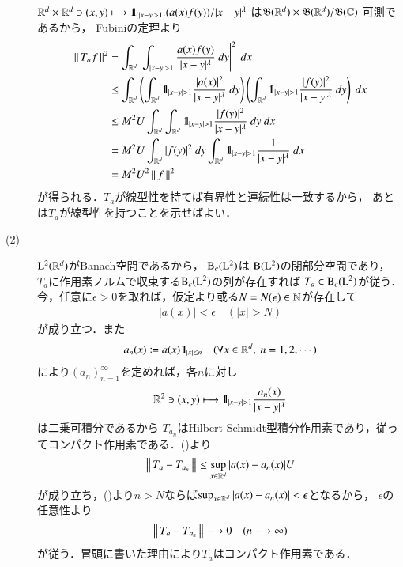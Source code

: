 \begin{prf}
\begin{description}
				$\R^d \times \R^d \ni (x,y) \longmapsto \defunc_{\left\{|x-y|>1\right\}} (a(x)f(y))/|x-y|^\lambda$
				は$\mathfrak{B}(\mathbb{R}^d) \times \mathfrak{B}(\mathbb{R}^d)/\mathfrak{B}(\mathbb{C})$-可測であるから，
				Fubiniの定理より
				\begin{align}
					\left\|\, T_a f\, \right\|_{}^2
					&= \int_{\mathbb{R}^d} \left| \int_{|x-y| > 1} \frac{a(x)f(y)}{|x-y|^\lambda}\ dy \right|^2\ dx \\
					&\leq \int_{\mathbb{R}^d} \left( \int_{\mathbb{R}^d} \mbox{1}\hspace{-0.25em}\mbox{l}_{|x-y| > 1} \frac{|a(x)|^2}{|x-y|^{\lambda}}\ dy \right)
						\left( \int_{\mathbb{R}^d} \mbox{1}\hspace{-0.25em}\mbox{l}_{|x-y| > 1} \frac{|f(y)|^2}{|x-y|^{\lambda}}\ dy \right)\ dx \\
					&\leq M^2 U \int_{\mathbb{R}^d} \int_{\mathbb{R}^d} \mbox{1}\hspace{-0.25em}\mbox{l}_{|x-y| > 1} \frac{|f(y)|^2}{|x-y|^{\lambda}}\ dy\ dx \\
					&= M^2 U \int_{\mathbb{R}^d} |f(y)|^2\ dy \int_{\mathbb{R}^d} \mbox{1}\hspace{-0.25em}\mbox{l}_{|x-y| > 1} \frac{1}{|x-y|^{\lambda}}\ dx \\
					&= M^2 U^2 \left\|\, f\, \right\|_{}^2
					\label{eq:report_6_1}
 				\end{align}
 				が得られる．$T_a$が線型性を持てば有界性と連続性は一致するから，
 				あとは$T_a$が線型性を持つことを示せばよい．
 				
			\item[(2)] $\mathrm{L}^2(\mathbb{R}^d)$がBanach空間であるから，
				$\mathrm{B}_c(\mathrm{L}^2) $は
				$\mathrm{B}(\mathrm{L}^2) $の閉部分空間であり，
				$T_a$に作用素ノルムで収束する$\mathrm{B}_c(\mathrm{L}^2) $の列が存在すれば
				$T_a \in \mathrm{B}_c(\mathrm{L}^2) $が従う．
				今，任意に$\epsilon > 0$を取れば，仮定より或る$N = N(\epsilon) \in \mathbb{N}$が存在して
				\begin{align}
					|a(x)| < \epsilon \quad (|x| > N)
					\label{eq:report_6_2}
				\end{align}
				が成り立つ．また
				\begin{align}
					a_n(x) \coloneqq a(x)\mbox{1}\hspace{-0.25em}\mbox{l}_{|x| \leq n}
					\quad (\forall x \in \mathbb{R}^d,\ n=1,2,\cdots)
				\end{align}
				により$(a_n)_{n=1}^{\infty}$を定めれば，各$n$に対し
				\begin{align}
					\mathbb{R}^2 \ni (x,y) \longmapsto \mbox{1}\hspace{-0.25em}\mbox{l}_{|x - y| > 1} \frac{a_n(x)}{|x-y|^\lambda}
				\end{align}
				は二乗可積分であるから
				$T_{a_n}$はHilbert-Schmidt型積分作用素であり，従ってコンパクト作用素である．()より
				\begin{align}
					\left\|\, T_a - T_{a_n}\, \right\|_{} \leq \operatorname*{sup}_{x \in \mathbb{R}^d} |a(x) - a_n(x)| U
				\end{align}
				が成り立ち，()より$n > N$ならば$\operatorname*{sup}_{x \in \mathbb{R}^d} |a(x) - a_n(x)| < \epsilon$となるから，
				$\epsilon$の任意性より
				\begin{align}
					\left\|\, T_a - T_{a_n}\, \right\|_{} \longrightarrow 0 \quad (n \longrightarrow \infty)
				\end{align}
				が従う．冒頭に書いた理由により$T_a$はコンパクト作用素である．
				\QED
		\end{description}
	\end{prf}
	

